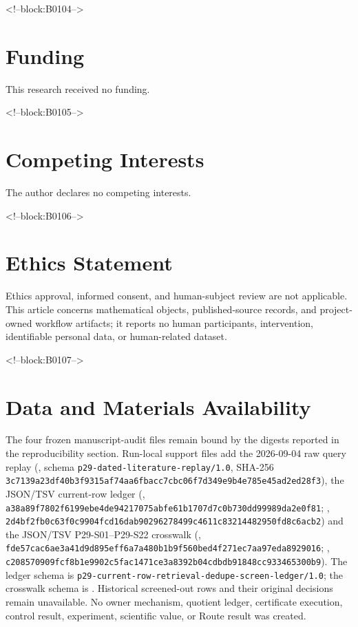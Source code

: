\documentclass[11pt,a4paper]{article}
\begin{document}
<!--block:B0104-->
\section*{Funding}
This research received no funding.

<!--block:B0105-->
\section*{Competing Interests}
The author declares no competing interests.

<!--block:B0106-->
\section*{Ethics Statement}
Ethics approval, informed consent, and human-subject review are not applicable. This article concerns mathematical objects, published-source records, and project-owned workflow artifacts; it reports no human participants, intervention, identifiable personal data, or human-related dataset.

<!--block:B0107-->
\section*{Data and Materials Availability}
\begingroup\sloppy
The four frozen manuscript-audit files remain bound by the digests reported in the reproducibility section. Run-local support files add the 2026-09-04 raw query replay (, schema \texttt{p29-dated-literature-replay/1.0}, SHA-256 \texttt{3c7139a2\allowbreak{}3df40b3f\allowbreak{}9315af74\allowbreak{}aa6fbacc\allowbreak{}7cbc06f7\allowbreak{}d349e9b4\allowbreak{}e785e45a\allowbreak{}d2ed28f3}), the JSON/TSV current-row ledger (, \texttt{a38a89f7\allowbreak{}802f6199\allowbreak{}ebe4de94\allowbreak{}217075ab\allowbreak{}fe61b170\allowbreak{}7d7c0b73\allowbreak{}0dd99989\allowbreak{}da2e0f81}; , \texttt{2d4bf2fb\allowbreak{}0c63f0c9\allowbreak{}904fcd16\allowbreak{}dab90296\allowbreak{}278499c4\allowbreak{}611c8321\allowbreak{}4482950f\allowbreak{}d8c6acb2}) and the JSON/TSV P29-S01--P29-S22 crosswalk (, \texttt{fde57cac\allowbreak{}6ae3a41d\allowbreak{}9d895eff\allowbreak{}6a7a480b\allowbreak{}1b9f560b\allowbreak{}ed4f271e\allowbreak{}c7aa97ed\allowbreak{}a8929016}; , \texttt{c2085709\allowbreak{}09fcf8b1\allowbreak{}e9902c5f\allowbreak{}ac1471ce\allowbreak{}3a8392b0\allowbreak{}4cdbdb91\allowbreak{}848cc933\allowbreak{}465300b9}). The ledger schema is \texttt{p29-current-row-retrieval-dedupe-screen-ledger/1.0}; the crosswalk schema is . Historical screened-out rows and their original decisions remain unavailable. No owner mechanism, quotient ledger, certificate execution, control result, experiment, scientific value, or Route result was created.
\end{document}
